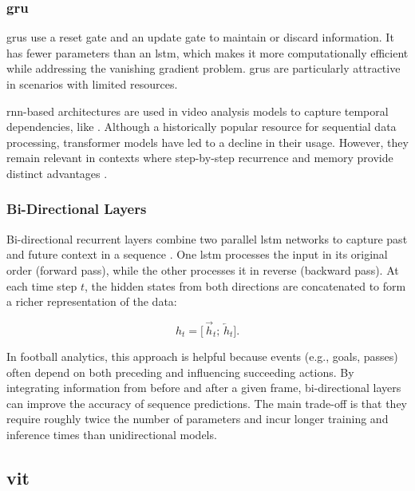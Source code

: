 \subsubsection{\acrfull{gru}}
\acrlong{gru}s use a reset gate and an update gate to maintain or discard information\cite{cho_gru_2014}. It has fewer parameters than an \acrshort{lstm}, which makes it more computationally efficient while addressing the vanishing gradient problem. \acrshort{gru}s are particularly attractive in scenarios with limited resources. 

\acrshort{rnn}-based architectures are used in video analysis models to capture temporal dependencies, like \textcite{bhogal_human_2023}. Although a historically popular resource for sequential data processing, transformer models have led to a decline in their usage. However, they remain relevant in contexts where step-by-step recurrence and memory provide distinct advantages \cite{ibm_rnn_2025}.

\subsubsection{Bi-Directional Layers}
\label{ssec:bi_directional_layers}

Bi-directional recurrent layers combine two parallel \acrshort{lstm} networks to capture past and future context in a sequence \cite{radhakrishnan_bi_lstm_2023, bhogal_human_2023}. One \acrshort{lstm} processes the input in its original order (forward pass), while the other processes it in reverse (backward pass). At each time step \(t\), the hidden states from both directions are concatenated to form a richer representation of the data:

\[
h_t = \bigl[\,\overrightarrow{h}_t;\,\overleftarrow{h}_t\bigr].
\]

In football analytics, this approach is helpful because events (e.g., goals, passes) often depend on both preceding and influencing succeeding actions. By integrating information from before and after a given frame, bi-directional layers can improve the accuracy of sequence predictions. The main trade-off is that they require roughly twice the number of parameters and incur longer training and inference times than unidirectional models.


\subsection{\acrfull{vit}}
\label{ssec:vision_transformers}

